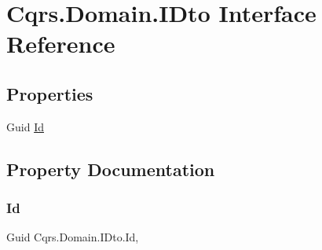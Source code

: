 \hypertarget{interfaceCqrs_1_1Domain_1_1IDto}{}\section{Cqrs.\+Domain.\+I\+Dto Interface Reference}
\label{interfaceCqrs_1_1Domain_1_1IDto}
\subsection*{Properties}
\begin{DoxyCompactItemize}
\item 
Guid \hyperlink{interfaceCqrs_1_1Domain_1_1IDto_a0314be1599b3bf36d05082be10cbca48}{Id}
\end{DoxyCompactItemize}


\subsection{Property Documentation}
\mbox{\label{interfaceCqrs_1_1Domain_1_1IDto_a0314be1599b3bf36d05082be10cbca48}} 
\subsubsection{\texorpdfstring{Id}{Id}}
{\footnotesize\ttfamily Guid Cqrs.\+Domain.\+I\+Dto.\+Id\hspace{0.3cm}{\ttfamily [get]}, {\ttfamily [set]}}

